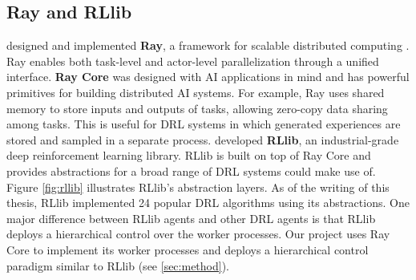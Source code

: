 \subsection{Ray and RLlib} \label{sec:ray}
\citeauthor{RayDistributedFramework_Moritz.Nishihara.ea_2018} designed and implemented \textbf{Ray}, a framework for scalable distributed computing \cite{RayDistributedFramework_Moritz.Nishihara.ea_2018}.
Ray enables both task-level and actor-level parallelization through a unified interface.
\textbf{Ray Core} was designed with AI applications in mind and has powerful primitives for building distributed AI systems.
For example, Ray uses shared memory to store inputs and outputs of tasks, allowing zero-copy data sharing among tasks.
This is useful for DRL systems in which generated experiences are stored and sampled in a separate process.
\citeauthor{RLlibAbstractionsDistributed_Liang.Liaw.ea_2018} developed \textbf{RLlib}, an industrial-grade deep reinforcement learning library.
RLlib is built on top of Ray Core and provides abstractions for a broad range of DRL systems could make use of.
Figure \ref{fig:rllib} illustrates RLlib's abstraction layers.
As of the writing of this thesis, RLlib implemented 24 popular DRL algorithms using its abstractions.
One major difference between RLlib agents and other DRL agents is that RLlib deploys a hierarchical control over the worker processes.
Our project uses Ray Core to implement its worker processes and deploys a hierarchical control paradigm similar to RLlib (see \ref{sec:method}).

